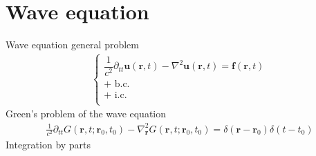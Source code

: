 \documentclass[letterpaper,10pt,english]{jupyterBook}
\begin{document}
\section{Wave equation}
\label{\detokenize{ch/green-function:wave-equation}}
\sphinxAtStartPar
Wave equation general problem
\begin{equation*}
\begin{split}\begin{cases}
  \dfrac{1}{c^2} \partial_{tt} \mathbf{u}(\mathbf{r},t) - \nabla^2 \mathbf{u}(\mathbf{r},t) = \mathbf{f}(\mathbf{r},t) \\
  \text{+ b.c.} \\
  \text{+ i.c.} \\
\end{cases}\end{split}
\end{equation*}
\sphinxAtStartPar
Green’s problem of the wave equation
\begin{equation*}
\begin{split}\frac{1}{c^2} \partial_{tt} G(\mathbf{r},t;\mathbf{r}_0,t_0) - \nabla_{\mathbf{r}}^2 G(\mathbf{r},t;\mathbf{r}_0,t_0) = \delta(\mathbf{r}-\mathbf{r}_0) \delta(t-t_0)\end{split}
\end{equation*}
\sphinxAtStartPar
Integration by parts
\end{document}
